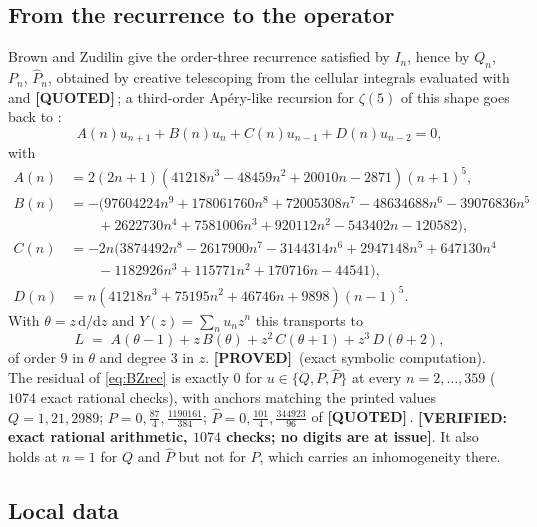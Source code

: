 \documentclass[11pt,reqno]{amsart}
\theoremstyle{plain}
\theoremstyle{definition}
\theoremstyle{remark}
\newcommand{\PROVED}{{\normalfont\sffamily\bfseries[PROVED]}}
\newcommand{\VER}[1]{{\normalfont\sffamily\bfseries[VERIFIED: #1]}}
\newcommand{\QUOTEDMARK}{{\normalfont\sffamily\bfseries[QUOTED]}}
\newcommand{\QUOTED}[1]{\QUOTEDMARK\,#1}
\newcommand{\dd}{\mathrm{d}}
\newcommand{\Phat}{\widehat{P}}
\begin{document}
\subsection{From the recurrence to the operator}
Brown and Zudilin give the order-three recurrence satisfied by $I_n$, hence by $Q_n$, $P_n$,
$\Phat_n$, obtained by creative telescoping from the cellular integrals evaluated with
\cite{Pa15} and \cite{Ko10} \QUOTED{\cite[\S2]{BZ}}; a third-order Ap\'ery-like recursion for
$\zeta(5)$ of this shape goes back to \cite{Zu02}:
\begin{equation}\label{eq:BZrec}
  A(n)u_{n+1}+B(n)u_n+C(n)u_{n-1}+D(n)u_{n-2}=0,
\end{equation}
with
\begin{align*}
  A(n)&=2(2n+1)(41218n^3-48459n^2+20010n-2871)(n+1)^5,\\
  B(n)&=-\bigl(97604224n^9+178061760n^8+72005308n^7-48634688n^6-39076836n^5\\
      &\qquad +2622730n^4+7581006n^3+920112n^2-543402n-120582\bigr),\\
  C(n)&=-2n\bigl(3874492n^8-2617900n^7-3144314n^6+2947148n^5+647130n^4\\
      &\qquad -1182926n^3+115771n^2+170716n-44541\bigr),\\
  D(n)&=n(41218n^3+75195n^2+46746n+9898)(n-1)^5 .
\end{align*}
With $\theta=z\,\dd/\dd z$ and $Y(z)=\sum_nu_nz^n$ this transports to
\begin{equation}\label{eq:BZop}
  L\;=\;A(\theta-1)+z\,B(\theta)+z^2\,C(\theta+1)+z^3\,D(\theta+2),
\end{equation}
of order $9$ in $\theta$ and degree $3$ in $z$. \PROVED\ (exact symbolic computation). The
residual of \eqref{eq:BZrec} is exactly $0$ for $u\in\{Q,P,\Phat\}$ at every $n=2,\dots,359$
($1074$ exact rational checks), with anchors matching the printed values
$Q=1,21,2989$; $P=0,\tfrac{87}{4},\tfrac{1190161}{384}$;
$\Phat=0,\tfrac{101}{4},\tfrac{344923}{96}$ of \QUOTED{\cite[\S2]{BZ}}.
\VER{exact rational arithmetic, $1074$ checks; no digits are at issue}. It also
holds at $n=1$ for $Q$ and $\Phat$ but not for $P$, which carries an inhomogeneity there.

\subsection{Local data}
\end{document}
